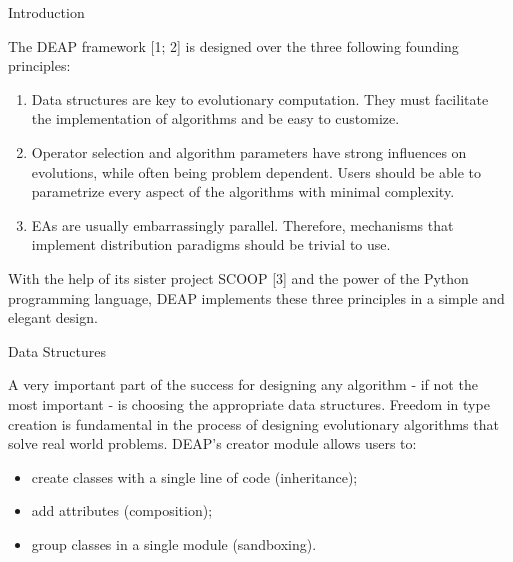 Introduction

The DEAP framework [1; 2] is designed over the three following founding
principles:
\begin{enumerate}
\item 
Data structures are key to evolutionary computation. They must facilitate
the implementation of algorithms and be easy to customize.

\item 
Operator selection and algorithm parameters have strong influences
on evolutions, while often being problem dependent. Users should
be able to parametrize every aspect of the algorithms with minimal
complexity.

\item 
 EAs are usually embarrassingly parallel. Therefore, mechanisms
that implement distribution paradigms should be trivial to use.

\end{enumerate}

With the help of its sister project SCOOP [3] and the power of the Python
programming language, DEAP implements these three principles in a
simple and elegant design.


Data Structures

A very important part of the success for designing any algorithm - if
not the most important - is choosing the appropriate data structures.
Freedom in type creation is fundamental in the process of designing evolutionary
algorithms that solve real world problems. DEAP's creator module
allows users to:
\begin{itemize}

\item 
create classes with a single line of code (inheritance);

\item 
add attributes (composition);

\item 
group classes in a single module (sandboxing).

\end{itemize}



